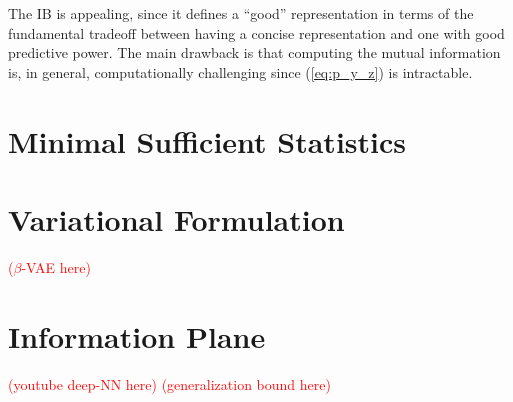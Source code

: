 \documentclass[11pt]{article}
\newcommand\myworries[1]{\textcolor{red}{(#1)}}
\begin{document}
The IB is appealing, since it defines a ``good'' representation in terms of the fundamental tradeoff between having a concise representation and one with good predictive power. The main drawback is that computing the mutual information is, in general, computationally challenging since (\ref{eq:p_y_z}) is intractable.

\section{Minimal Sufficient Statistics}

\section{Variational Formulation}


\myworries{$\beta$-VAE here}

\section{Information Plane}




\myworries{youtube deep-NN here}
\myworries{generalization bound here}


 
\end{document}
